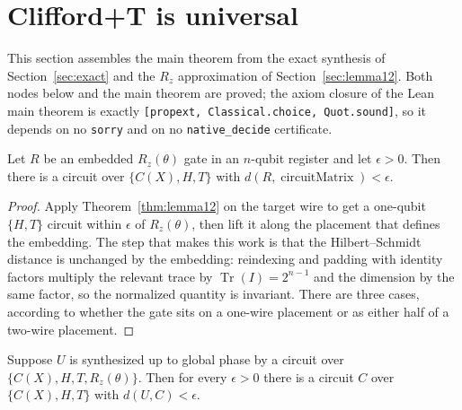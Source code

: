 \section{Clifford+T is universal}
\label{sec:universal}

This section assembles the main theorem from the exact synthesis of
Section~\ref{sec:exact} and the $R_z$ approximation of
Section~\ref{sec:lemma12}.  Both nodes below and the main theorem are proved;
the axiom closure of the Lean main theorem is exactly
\texttt{[propext, Classical.choice, Quot.sound]}, so it depends on no
\texttt{sorry} and on no \texttt{native\_decide} certificate.

\begin{lemma}
  \label{lem:rz_embedded_approx}
  \leanok
  Let $R$ be an embedded $R_z(\theta)$ gate in an $n$-qubit register and let
  $\epsilon > 0$.  Then there is a circuit over $\{C(X),H,T\}$ with
  $d(R, \operatorname{circuitMatrix}) < \epsilon$.
\end{lemma}

\begin{proof}
  \leanok
  Apply Theorem~\ref{thm:lemma12} on the target wire to get a one-qubit
  $\{H,T\}$ circuit within $\epsilon$ of $R_z(\theta)$, then lift it along the
  placement that defines the embedding.  The step that makes this work is that
  the Hilbert--Schmidt distance is unchanged by the embedding: reindexing and
  padding with identity factors multiply the relevant trace by
  $\operatorname{Tr}(I) = 2^{n-1}$ and the dimension by the same factor, so the
  normalized quantity is invariant.  There are three cases, according to
  whether the gate sits on a one-wire placement or as either half of a two-wire
  placement.
\end{proof}

\begin{lemma}
  \label{lem:rz_replacement}
  \leanok
  Suppose $U$ is synthesized up to global phase by a circuit over
  $\{C(X),H,T,R_z(\theta)\}$.  Then for every $\epsilon > 0$ there is a circuit
  $C$ over $\{C(X),H,T\}$ with $d(U, C) < \epsilon$.
\end{lemma}

